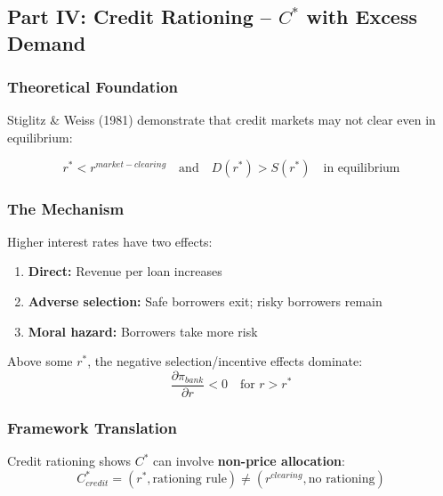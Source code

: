 \subsection{Part IV: Credit Rationing – $C^*$ with Excess Demand}

\subsubsection{Theoretical Foundation}

Stiglitz \& Weiss (1981) demonstrate that credit markets may not clear even 
in equilibrium:

\begin{equation}
\boxed{
r^* < r^{market-clearing} \quad \text{and} \quad D(r^*) > S(r^*) \quad \text{in equilibrium}
}
\label{eq:sw-rationing}
\end{equation}

\subsubsection{The Mechanism}

Higher interest rates have two effects:
\begin{enumerate}
    \item \textbf{Direct:} Revenue per loan increases
    \item \textbf{Adverse selection:} Safe borrowers exit; risky borrowers remain
    \item \textbf{Moral hazard:} Borrowers take more risk
\end{enumerate}

Above some $r^*$, the negative selection/incentive effects dominate:
\begin{equation}
\frac{\partial \pi_{bank}}{\partial r} < 0 \quad \text{for } r > r^*
\end{equation}

\subsubsection{Framework Translation}

Credit rationing shows $C^*$ can involve \textbf{non-price allocation}:
\begin{equation}
C^*_{credit} = (r^*, \text{rationing rule}) \neq (r^{clearing}, \text{no rationing})
\end{equation}

